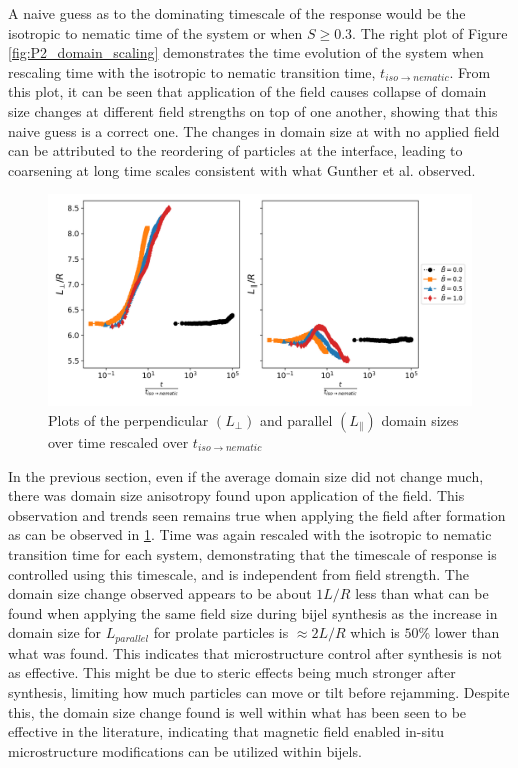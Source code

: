 A naive guess as to the dominating timescale of the response would be the isotropic to nematic time of the system or when $S \geq 0.3$. The right plot of Figure \ref{fig:P2_domain_scaling} demonstrates the time evolution of the system when rescaling time with the isotropic to nematic transition time, $t_{iso \rightarrow nematic}$. From this plot, it can be seen that application of the field causes collapse of domain size changes at different field strengths on top of one another, showing that this naive guess is a correct one. The changes in domain size at with no applied field can be attributed to the reordering of particles at the interface, leading to coarsening at long time scales consistent with what Gunther et al. observed. \cite{gunther_timescales_2014}

\begin{figure}
    \centering
    \includegraphics[scale = 0.5]{figures/results/paper2/domain_size_aniso.png}
    \caption{Plots of the perpendicular $(L_{\perp})$ and parallel $(L_{\parallel})$ domain sizes over time rescaled over $t_{iso \rightarrow nematic}$}
    \label{fig:P2_domain_aniso}
\end{figure}

In the previous section, even if the average domain size did not change much, there was domain size anisotropy found upon application of the field. This observation and trends seen remains true when applying the field after formation as can be observed in \ref{fig:P2_domain_aniso}. Time was again rescaled with the isotropic to nematic transition time for each system, demonstrating that the timescale of response is controlled using this timescale, and is independent from field strength. The domain size change observed appears to be about $1 L/R$ less than what can be found when applying the same field size during bijel synthesis as the increase in domain size for $L_{parallel}$ for prolate particles is $\approx 2 L/R$ which is $50 \%$ lower than what was found. This indicates that microstructure control after synthesis is not as effective. This might be due to steric effects being much stronger after synthesis, limiting how much particles can move or tilt before rejamming. Despite this, the domain size change found is well within what has been seen to be effective in the literature, indicating that magnetic field enabled in-situ microstructure modifications can be utilized within bijels. \cite{cha_bicontinuous_2019, khan_nanostructured_2022, vanoli_bijels_2022}

